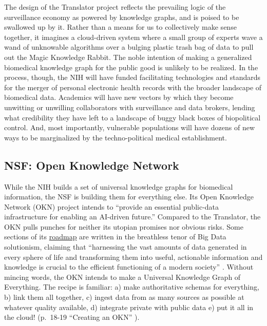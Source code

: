 The design of the Translator project reflects the prevailing logic of
the surveillance economy as powered by knowledge graphs, and is poised
to be swallowed up by it. Rather than a means for us to collectively
make sense together, it imagines a cloud-driven system where a small
group of experts wave a wand of unknowable algorithms over a bulging
plastic trash bag of data to pull out the Magic Knowledge Rabbit. The
noble intention of making a generalized biomedical knowledge graph for
the public good is unlikely to be realized. In the process, though, the
NIH will have funded facilitating technologies and standards for the
merger of personal electronic health records with the broader landscape
of biomedical data. Academics will have new vectors by which they become
unwitting or unwilling collaborators with surveillance and data brokers, lending what
credibility they have left to a landscape of buggy black boxes of
biopolitical control. And, most importantly, vulnerable populations will
have dozens of new ways to be marginalized by the techno-political
medical establishment.

\hypertarget{nsf-open-knowledge-network}{%
\subsection{NSF: Open Knowledge
Network}\label{nsf-open-knowledge-network}}

While the NIH builds a set of universal knowledge graphs for biomedical
information, the NSF is building them for everything else. Its Open
Knowledge Network (OKN) project intends to ``provide an essential
public-data infrastructure for enabling an AI-driven future.'' \cite{baruOpenKnowledgeNetwork2022}  Compared to the Translator, the OKN
pulls punches for neither its utopian promises nor obvious risks. Some
sections of its
\href{https://web.archive.org/web/20221028095757/https://nsf-gov-resources.nsf.gov/2022-09/OKN\%20Roadmap\%20-\%20Report_v03.pdf}{roadmap}
are written in the breathless tenor of Big Data solutionism, claiming
that ``harnessing the vast amounts of data generated in every sphere of
life and transforming them into useful, actionable information and
knowledge is crucial to the efficient functioning of a modern society''
\cite{baruOpenKnowledgeNetwork2022} . Without mincing words, the
OKN intends to make a Universal Knowledge Graph of Everything. The
recipe is familiar: a) make authoritative schemas for everything, b)
link them all together, c) ingest data from as many sources as possible
at whatever quality available, d) integrate private with public data e)
put it all in the cloud! (p.~18-19 ``Creating an OKN'' \cite{bigdatainteragencyworkinggroupOpenKnowledgeNetwork2018} ).

